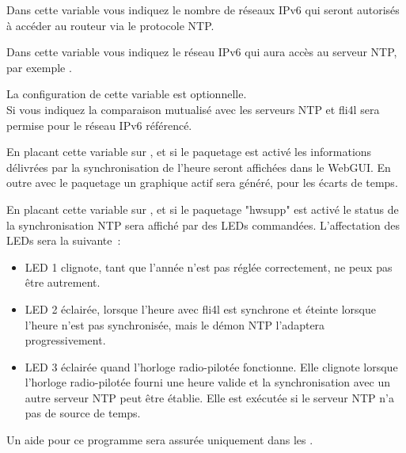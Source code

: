 \begin{description}

  Dans cette variable vous indiquez le nombre de réseaux IPv6 qui seront autorisés à accéder
  au routeur via le protocole NTP.


  Dans cette variable vous indiquez le réseau IPv6 qui aura accès au serveur NTP,
  par exemple .


  La configuration de cette variable est optionnelle.\\
  Si vous indiquez  la comparaison mutualisé avec les serveurs NTP et fli4l sera
  permise pour le réseau IPv6 référencé.


  En placant cette variable sur , et si le paquetage  est
  activé les informations délivrées par la synchronisation de l'heure seront affichées dans
  le WebGUI. En outre avec le paquetage  un graphique actif sera généré,
  pour les écarts de temps.


  En placant cette variable sur , et si le paquetage "hwsupp" est activé le status
  de la synchronisation NTP sera affiché par des LEDs commandées. L'affectation des LEDs sera
  la suivante~:
  \begin{itemize}
  \item LED 1 clignote, tant que l'année n'est pas réglée correctement, ne peux pas
		être autrement.
  \item LED 2 éclairée, lorsque l'heure avec fli4l est synchrone et éteinte lorsque l'heure
		n'est pas synchronisée, mais le démon NTP l'adaptera progressivement.
  \item LED 3 éclairée quand l'horloge radio-pilotée fonctionne. Elle clignote lorsque
		l'horloge radio-pilotée fourni une heure valide et la synchronisation avec un autre
		serveur NTP peut être établie. Elle est exécutée si le serveur NTP n'a pas de source
		de temps.
  \end{itemize}

\end{description}

Un aide pour ce programme sera assurée uniquement dans les .


